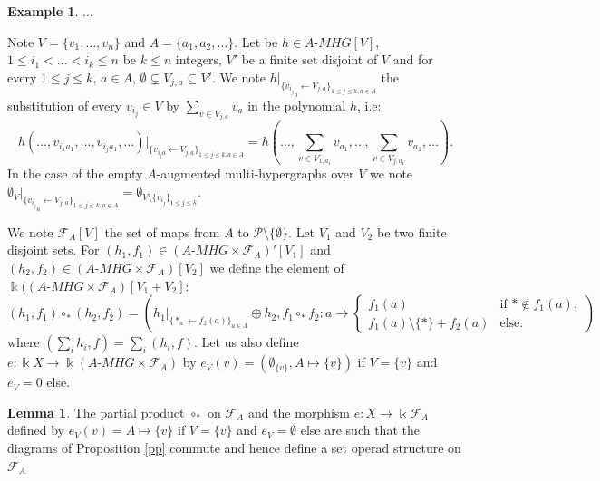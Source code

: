 \documentclass[a4paper]{article}
\theoremstyle{definition}
\newtheorem{example}[definition]{Example}
\newtheorem{lemma}[definition]{Lemma}
\begin{document}
\begin{example}
...
\end{example}

Note $V = \{v_1,\dots, v_n\}$ and $A=\{a_1, a_2, \dots\}$. Let be $h\in A\text{-}MHG[V]$, $1\leq i_1 <\dots < i_k\leq n$ be $k\leq n$ integers, $V'$ be a finite set disjoint of $V$ and for every $1\leq j\leq k$, $a\in A$, $\emptyset\subsetneq V_{j,a} \subseteq V'$. We note $h|_{\{ {v_{i_j}}_a \leftarrow V_{j,a}\}_{1\leq j\leq k, a\in A}}$ the substitution of every $v_{i_j}\in V$ by $\sum_{v\in V_{j,a}} v_a$ in the polynomial $h$, i.e: $$h(\dots, v_{i_1a_1},\dots, v_{i_ja_1},\dots)|_{\{ v_{i_ja} \leftarrow V_{j,a}\}_{1\leq j\leq k, a\in A}} = h(\dots, \sum_{v\in V_{1,a_1}} v_{a_1}, \dots, \sum_{v\in V_{j,a_1}} v_{a_1}, \dots).$$
In the case of the empty $A$-augmented multi-hypergraphs over $V$ we note $\emptyset_V|_{\{ {v_{i_j}}_a \leftarrow V_{j,a}\}_{1\leq j\leq k, a\in A}} = \emptyset_{V\setminus\{v_{i_j}\}_{1\leq j\leq k}}$.

We note $\mathcal{F}_A[V]$ the set of maps from $A$ to $\mathcal{P}\setminus\{\emptyset\}$.
Let $V_1$ and $V_2$ be two finite disjoint sets. For $(h_1,f_1)\in (A\text{-}MHG\times \mathcal{F}_A)'[V_1]$ and  $(h_2,f_2)\in (A\text{-}MHG\times \mathcal{F}_A)[V_2]$ we define the element of $\Bbbk((A\text{-}MHG\times\mathcal{F}_A)[V_1+V_2]$:
$$ (h_1,f_1)\circ_{\ast}(h_2,f_2) = \left(h_1|_{\{\ast_a\leftarrow f_2(a)\}_{a\in A}}\oplus h_2, f_1\circ_\ast f_2: a\rightarrow\left\{\begin{array}{cl}
f_1(a)  & \text{if $\ast\not\in f_1(a)$},    \\ 
f_1(a)\setminus\{\ast\} + f_2(a)  & \text{else.}\end{array}\right.\right)$$
where $(\sum_i h_i, f) = \sum_i(h_i,f)$.
Let us also define $e:\Bbbk X \rightarrow \Bbbk (A\text{-}MHG\times \mathcal{F}_A)$ by $e_{V}(v) = (\emptyset_{\{v\}},A\mapsto\{v\})$ if $V=\{v\}$ and $e_V = 0$ else.

\begin{lemma}
\label{opfunc}
The partial product $\circ_{\ast}$ on $\mathcal{F}_A$ and the morphism $e:X \rightarrow \Bbbk \mathcal{F}_A$ defined by $e_{V}(v) = A\mapsto\{v\}$ if $V=\{v\}$ and $e_V = \emptyset$ else are such that the diagrams of Proposition \ref{pp} commute and hence define a set operad structure on $\mathcal{F}_A$
\end{lemma}
\end{document}
